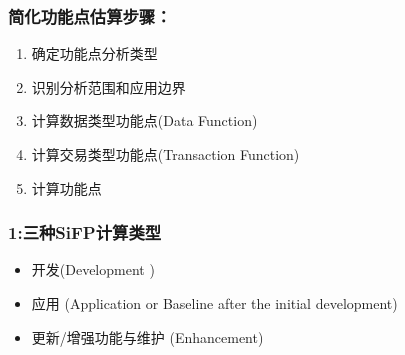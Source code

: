\hypertarget{ux7b80ux5316ux529fux80fdux70b9ux4f30ux7b97ux6b65ux9aa4}{%
\subsubsection{简化功能点估算步骤：}\label{ux7b80ux5316ux529fux80fdux70b9ux4f30ux7b97ux6b65ux9aa4}}

\begin{enumerate}
\tightlist
\item
  确定功能点分析类型
\item
  识别分析范围和应用边界
\item
  计算数据类型功能点(Data Function)
\item
  计算交易类型功能点(Transaction Function)
\item
  计算功能点
\end{enumerate}

\hypertarget{ux4e09ux79cdsifpux8ba1ux7b97ux7c7bux578b}{%
\subsubsection{1:三种SiFP计算类型}\label{ux4e09ux79cdsifpux8ba1ux7b97ux7c7bux578b}}

\begin{itemize}
\tightlist
\item
  开发(Development )
\end{itemize}

\begin{description}
\item[]
\end{description}

\begin{itemize}
\tightlist
\item
  应用 (Application or Baseline after the initial development)
\end{itemize}

\begin{description}
\item[]
\end{description}

\begin{itemize}
\tightlist
\item
  更新/增强功能与维护 (Enhancement)
\end{itemize}

